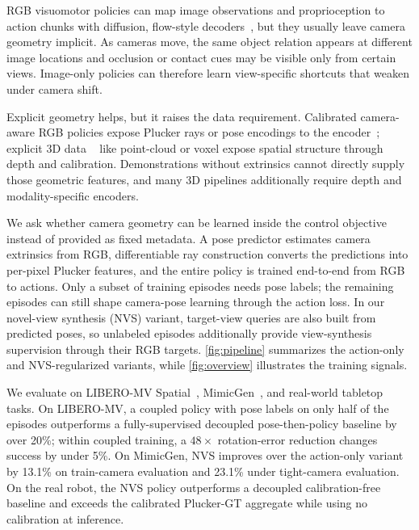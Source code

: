 RGB visuomotor policies can map image observations and proprioception to action
chunks with diffusion, flow-style decoders~\citep{chi2023diffusionpolicy,yan2025maniflow},
but they usually leave camera geometry implicit.  As cameras move, the same
object relation appears at different image locations and occlusion or contact
cues may be visible only from certain views.  Image-only policies can therefore
learn view-specific shortcuts that weaken under camera shift.

Explicit geometry helps, but it raises the data requirement.  Calibrated
camera-aware RGB policies expose Plucker rays or pose encodings to the
encoder~\citep{anonymous2026cameraaware}; explicit 3D data ~\citep{shridhar2023peract,goyal2023rvt,ze2024dp3,ke2024dda,yan2025maniflow,peri2024pcwm,zhu2026equact,zhao2025gsl} like point-cloud or voxel expose spatial structure through depth and calibration.  Demonstrations
without extrinsics cannot directly supply those geometric features, and many 3D
pipelines additionally require depth and modality-specific encoders.

We ask whether camera geometry can be learned inside the control objective
instead of provided as fixed metadata.  A pose predictor estimates camera
extrinsics from RGB, differentiable ray construction converts the predictions
into per-pixel Plucker features, and the entire policy is trained end-to-end
from RGB to actions.  Only a subset of training episodes needs pose labels; the
remaining episodes can still shape camera-pose learning through the action loss.
In our novel-view synthesis (NVS) variant, target-view queries are also built
from predicted poses, so unlabeled episodes additionally provide view-synthesis
supervision through their RGB targets.  \autoref{fig:pipeline} summarizes the action-only and
NVS-regularized variants, while \autoref{fig:overview} illustrates the training
signals.

We evaluate on LIBERO-MV Spatial~\citep{liu2023libero}, MimicGen~\citep{mandlekar2023mimicgen},
and real-world tabletop tasks.  On LIBERO-MV, a coupled policy with
pose labels on only half of the episodes outperforms a fully-supervised
decoupled pose-then-policy baseline by over 20\%; within coupled training,
a \(48\times\) rotation-error reduction changes success by under 5\%.
On MimicGen, NVS improves over the action-only variant by 13.1\% on
train-camera evaluation and 23.1\% under tight-camera evaluation.  On the
real robot, the NVS policy outperforms a decoupled calibration-free baseline and
exceeds the calibrated Plucker-GT aggregate while using no calibration at
inference.

